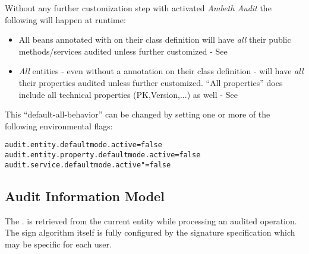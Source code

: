 Without any further customization step with activated \textit{Ambeth Audit} the following will happen at runtime:
\begin{itemize}
	\item All beans annotated with \type{\@Audited} on their class definition will have \emph{all} their public methods/services audited unless further customized - See 
	\item \emph{All} entities - even without a  annotation on their class definition - will have \emph{all} their properties audited unless further customized. ``All properties'' does include all technical properties (PK,Version,...) as well - See 
\end{itemize}

This ``default-all-behavior'' can be changed by setting one or more of the following environmental flags:
\begin{lstlisting}[style=Props]
audit.entity.defaultmode.active=false
audit.entity.property.defaultmode.active=false
audit.service.defaultmode.active"=false
\end{lstlisting}

\subsection{Audit Information Model}

\def\showimgref{img/gen/2014-10-04-DeK-Ambeth-Audit-3}

The . is retrieved from the current  entity while processing an audited operation. The sign algorithm itself is fully configured by the signature specification which may be specific for each user.


\def\showimgref{img/gen/2014-10-04-DeK-Ambeth-Audit-4}


